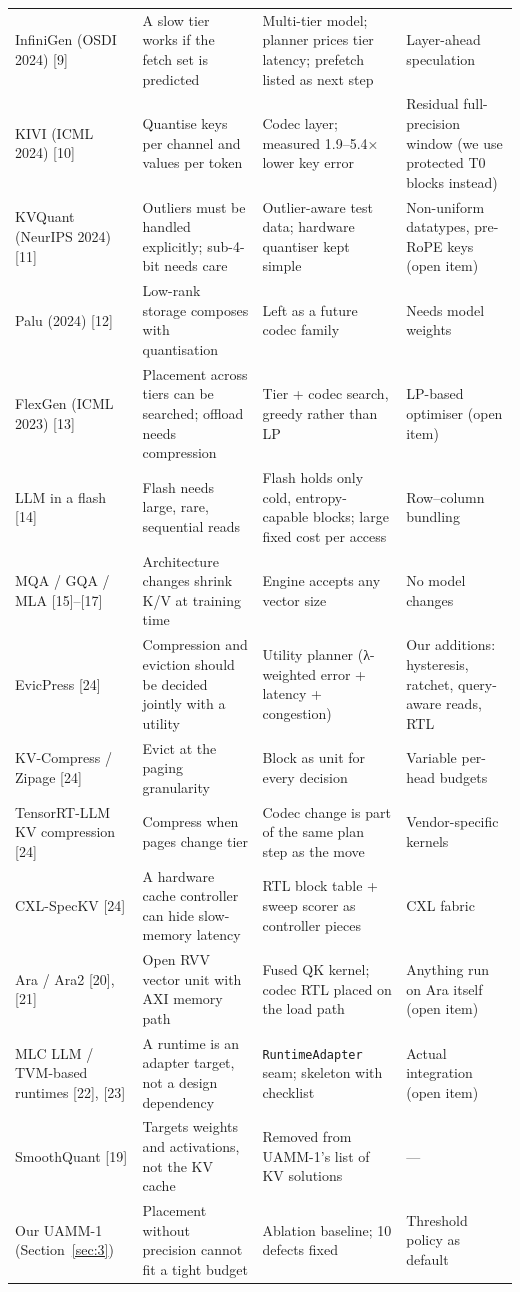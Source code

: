 \documentclass[12pt,a4paper]{report}
\begin{document}
{\begin{longtable}{>{\raggedright\arraybackslash}p{1.40in}>{\raggedright\arraybackslash}p{1.75in}>{\raggedright\arraybackslash}p{1.66in}>{\raggedright\arraybackslash}p{1.05in}}
InfiniGen (OSDI 2024) [9] & A slow tier works if the fetch set is predicted & Multi-tier model; planner prices tier latency; prefetch listed as next step & Layer-ahead speculation \\
KIVI (ICML 2024) [10] & Quantise keys per channel and values per token & Codec layer; measured 1.9–5.4× lower key error & Residual full-precision window (we use protected T0 blocks instead) \\
KVQuant (NeurIPS 2024) [11] & Outliers must be handled explicitly; sub-4-bit needs care & Outlier-aware test data; hardware quantiser kept simple & Non-uniform datatypes, pre-RoPE keys (open item) \\
Palu (2024) [12] & Low-rank storage composes with quantisation & Left as a future codec family & Needs model weights \\
FlexGen (ICML 2023) [13] & Placement across tiers can be searched; offload needs compression & Tier + codec search, greedy rather than LP & LP-based optimiser (open item) \\
LLM in a flash [14] & Flash needs large, rare, sequential reads & Flash holds only cold, entropy-capable blocks; large fixed cost per access & Row–column bundling \\
MQA / GQA / MLA [15]–[17] & Architecture changes shrink K/V at training time & Engine accepts any vector size & No model changes \\
EvicPress [24] & Compression and eviction should be decided jointly with a utility & Utility planner (λ-weighted error + latency + congestion) & Our additions: hysteresis, ratchet, query-aware reads, RTL \\
KV-Compress / Zipage [24] & Evict at the paging granularity & Block as unit for every decision & Variable per-head budgets \\
TensorRT-LLM KV compression [24] & Compress when pages change tier & Codec change is part of the same plan step as the move & Vendor-specific kernels \\
CXL-SpecKV [24] & A hardware cache controller can hide slow-memory latency & RTL block table + sweep scorer as controller pieces & CXL fabric \\
Ara / Ara2 [20], [21] & Open RVV vector unit with AXI memory path & Fused QK kernel; codec RTL placed on the load path & Anything run on Ara itself (open item) \\
MLC LLM / TVM-based runtimes [22], [23] & A runtime is an adapter target, not a design dependency & \texttt{RuntimeAdapter} seam; skeleton with checklist & Actual integration (open item) \\
SmoothQuant [19] & Targets weights and activations, not the KV cache & Removed from UAMM-1's list of KV solutions & — \\
Our UAMM-1 (Section~\ref{sec:3}) & Placement without precision cannot fit a tight budget & Ablation baseline; 10 defects fixed & Threshold policy as default \\
\bottomrule
\end{longtable}}
\end{document}
